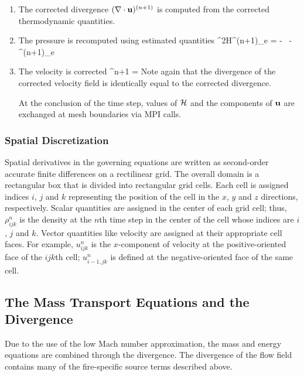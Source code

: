 \documentclass[11pt]{book}
\begin{document}
\begin{enumerate}
\item The corrected divergence $(\nabla \cdot {\bf u})^{(n+1)}$ is computed from the
corrected thermodynamic quantities.

\item The pressure is recomputed using estimated quantities
\be \nabla^2{\cal H}^{(n+1)_e} = - \, 
  - \nabla \cdot \bF^{(n+1)_e}  \ee

\item The velocity is corrected
\be \bu^{n+1} = \ha {} \ee
Note again that the divergence of the corrected velocity field is
identically equal to the corrected divergence.

At the conclusion of the time step, values of $\cal H$ and the components of ${\bf u}$ are exchanged at
mesh boundaries via MPI calls.

\end{enumerate}

\subsubsection{Spatial Discretization}

Spatial derivatives in the governing equations are written as second-order accurate
finite differences on a rectilinear grid. The overall
domain is a rectangular box that is divided into rectangular grid cells.
Each cell is assigned indices $i$, $j$ and $k$ representing the
position of the cell in the $x$, $y$ and $z$ directions, respectively.
Scalar quantities are assigned in the center of each grid cell; thus,
$\rho_{ijk}^n$ is the density at the $n$th time step in the center
of the cell whose indices are $i$, $j$ and $k$. Vector quantities like
velocity are assigned at their appropriate cell faces. For example,
$u_{ijk}^n$ is the $x$-component of velocity at the
positive-oriented face of the $ijk$th cell; $u_{i-1,jk}^n$ is defined at the
negative-oriented face of the same cell.


\clearpage
\subsection{The Mass Transport Equations and the Divergence}

Due to the use of the low Mach number approximation, the
mass and energy equations are combined through the divergence. The
divergence of the flow field contains
many of the fire-specific source terms described above.
\end{document}
